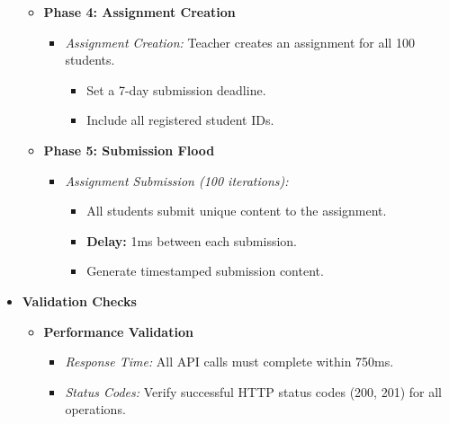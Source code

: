 \begin{itemize}
\begin{itemize}
        \item \textbf{Phase 4: Assignment Creation}
        \begin{itemize}
            \item \textit{Assignment Creation:} Teacher creates an assignment for all 100 students.
            \begin{itemize}
                \item Set a 7-day submission deadline.
                \item Include all registered student IDs.
            \end{itemize}
        \end{itemize}
        
        \item \textbf{Phase 5: Submission Flood}
        \begin{itemize}
            \item \textit{Assignment Submission (100 iterations):}
            \begin{itemize}
                \item All students submit unique content to the assignment.
                \item \textbf{Delay:} 1ms between each submission.
                \item Generate timestamped submission content.
            \end{itemize}
        \end{itemize}
    \end{itemize}
    
    \item \textbf{Validation Checks}
    \begin{itemize}
        \item \textbf{Performance Validation}
        \begin{itemize}
            \item \textit{Response Time:} All API calls must complete within 750ms.
            \item \textit{Status Codes:} Verify successful HTTP status codes (200, 201) for all operations.
        \end{itemize}
    \end{itemize}
\end{itemize}
